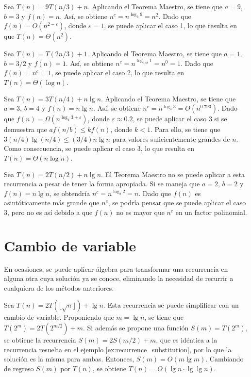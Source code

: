 \begin{expl}
  Sea $T(n)=9T(n/3)+n$. Aplicando el Teorema Maestro, se tiene que \(a=9\), 
  \(b=3\) y \(f(n)=n\). 
  Así, se obtiene \(n^c=n^{\log_{3}{9}}=n^2\). 
  Dado que \(f(n)=O(n^{2-\varepsilon})\), donde \(\varepsilon=1\), se puede aplicar el caso 1, lo que resulta en que \(T(n)=\Theta(n^2)\). \exend
\end{expl}

\begin{expl}
  Sea \(T(n)=T(2n/3)+1\). 
  Aplicando el Teorema Maestro, se tiene que \(a=1\), \(b=3/2\) y \(f(n)=1\). 
  Así, se obtiene \(n^c=n^{\log_{3/2}{1}}=n^0=1\).
  Dado que \(f(n)=n^c=1\), se puede aplicar el caso 2, lo que resulta en \(T(n)=\Theta(\log{n})\). \exend
\end{expl}

\begin{expl}
  Sea \(T(n)=3T(n/4)+n\lg{n}\). 
  Aplicando el Teorema Maestro, se tiene que \(a=3\), \(b=4\) y \(f(n)=n\lg{n}\). 
  Así, se obtiene \(n^c=n^{\log_{4}{3}}=O(n^{0.793})\). 
  Dado que \(f(n)=\Omega(n^{\log_{4}{3}+\varepsilon})\), donde \(\varepsilon\approx 0.2\), se puede aplicar el caso 3 si se demuestra 
  que \(af(n/b)\leq kf(n)\), donde \(k<1\). 
  Para ello, se tiene que \(3(n/4)\lg(n/4)\leq (3/4)n\lg{n}\) para valores suficientemente grandes de \(n\). 
  Como consecuencia, se puede aplicar el caso 3, lo que resulta en \(T(n)=\Theta(n\log n)\). \exend
\end{expl}

\begin{expl}
  Sea \(T(n)=2T(n/2)+n\lg{n}\). 
  El Teorema Maestro no se puede aplicar a esta recurrencia a pesar de tener la forma apropiada. 
  Si se maneja que \(a=2\), \(b=2\) y \(f(n)=n\lg{n}\), se obtendría \(n^c=n^{\log_{2}{2}}=n\).
  Dado que \(f(n)\) es asintóticamente más grande que \(n^c\), se podría pensar que se puede aplicar el caso 3, pero no es así debido a que \(f(n)\) no es
  mayor que \(n^c\) en un factor polinomial. \exend
\end{expl}

\section{Cambio de variable}

En ocasiones, se puede aplicar álgebra para transformar una recurrencia en alguna otra cuya solución ya se conoce, eliminando la necesidad de recurrir a cualquiera de los métodos anteriores.

\begin{expl}
  Sea \(T(n)=2T(\lfloor \sqrt{n} \rfloor)+\lg{n}\). Esta recurrencia se 
  puede simplificar con un cambio de variable. 
  Proponiendo que \(m=\lg{n}\), se tiene que \(T(2^m)=2T(2^{m/2})+m\). 
  Si además se propone una función \(S(m)=T(2^m)\), se obtiene la recurrencia \(S(m)=2S(m/2)+m\), que es idéntica a la recurrencia resuelta en el ejemplo \ref{ex:recurrence_substitution}, por lo que la solución es la misma para ambas. 
  Entonces, \(S(m)=O(m\lg m)\). 
  Cambiando de regreso \(S(m)\) por \(T(n)\), se obtiene \(T(n)=O(\lg{n}\cdot\lg\lg{n})\). \exend
\end{expl}

